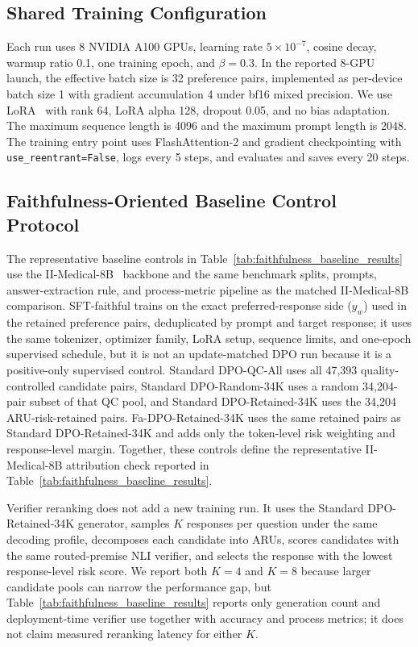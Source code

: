 \documentclass[a4paper,fleqn,doubleblind]{cas-sc}
\begin{document}
\subsection{Shared Training Configuration}

Each run uses 8 NVIDIA A100 GPUs, learning rate $5\times10^{-7}$, cosine decay, warmup ratio 0.1, one training epoch, and $\beta=0.3$. In the reported 8-GPU launch, the effective batch size is 32 preference pairs, implemented as per-device batch size 1 with gradient accumulation 4 under bf16 mixed precision. We use LoRA~\cite{hu2022lora} with rank 64, LoRA alpha 128, dropout 0.05, and no bias adaptation. The maximum sequence length is 4096 and the maximum prompt length is 2048. The training entry point uses FlashAttention-2 and gradient checkpointing with \texttt{use\_reentrant=False}, logs every 5 steps, and evaluates and saves every 20 steps.

\subsection{Faithfulness-Oriented Baseline Control Protocol}
\label{app:faithfulness_baseline_protocol}

The representative baseline controls in Table~\ref{tab:faithfulness_baseline_results} use the II-Medical-8B~\cite{intelligentinternet2025iimedical8b} backbone and the same benchmark splits, prompts, answer-extraction rule, and process-metric pipeline as the matched II-Medical-8B comparison. SFT-faithful trains on the exact preferred-response side ($y_w$) used in the retained preference pairs, deduplicated by prompt and target response; it uses the same tokenizer, optimizer family, LoRA setup, sequence limits, and one-epoch supervised schedule, but it is not an update-matched DPO run because it is a positive-only supervised control. Standard DPO-QC-All uses all 47,393 quality-controlled candidate pairs, Standard DPO-Random-34K uses a random 34,204-pair subset of that QC pool, and Standard DPO-Retained-34K uses the 34,204 ARU-risk-retained pairs. Fa-DPO-Retained-34K uses the same retained pairs as Standard DPO-Retained-34K and adds only the token-level risk weighting and response-level margin. Together, these controls define the representative II-Medical-8B attribution check reported in Table~\ref{tab:faithfulness_baseline_results}.

Verifier reranking does not add a new training run. It uses the Standard DPO-Retained-34K generator, samples $K$ responses per question under the same decoding profile, decomposes each candidate into ARUs, scores candidates with the same routed-premise NLI verifier, and selects the response with the lowest response-level risk score. We report both $K=4$ and $K=8$ because larger candidate pools can narrow the performance gap, but Table~\ref{tab:faithfulness_baseline_results} reports only generation count and deployment-time verifier use together with accuracy and process metrics; it does not claim measured reranking latency for either $K$.
\end{document}
